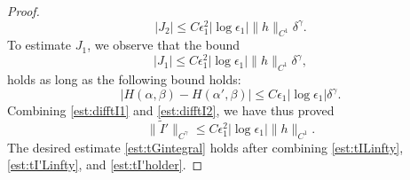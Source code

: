 \documentclass[11pt,reqno]{amsproc}
\newcommand{\eps}{\epsilon}
\begin{document}
\begin{proof}
\begin{equation}
    \label{est:difftI2}
    |J_2| \le C\eps_1^2 |\log\eps_1| \|h\|_{C^1}\delta^\gamma.
\end{equation}
To estimate $J_1$, we observe that the bound
\begin{equation}
    \label{est:difftI1}
    |J_1| \le C\eps_1^2 |\log\eps_1| \|h\|_{C^1}\delta^\gamma,
\end{equation}
holds as long as the following bound holds:
\begin{equation}
    \label{est:logliptildeG}
    |H(\alpha,\beta) - H(\alpha',\beta)| \le C\eps_1 |\log \eps_1| \delta^\gamma.
\end{equation}
Combining \eqref{est:difftI1} and \eqref{est:difftI2}, we have thus proved
\begin{equation}
    \label{est:tI'holder}
    \|\tilde I'\|_{C^\gamma} \le C\eps_1^2 |\log\eps_1| \|h\|_{C^1}.
\end{equation}
The desired estimate \eqref{est:tGintegral} holds after combining \eqref{est:tILinfty}, \eqref{est:tI'Linfty}, and \eqref{est:tI'holder}.


\end{proof}
\end{document}
